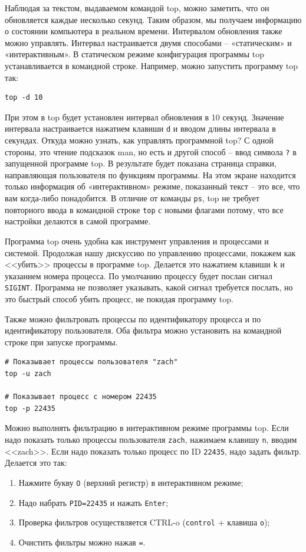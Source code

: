 \documentclass[12pt]{article}
\providecommand{\tightlist}{%
  \setlength{\itemsep}{0pt}\setlength{\parskip}{0pt}}
\begin{document}
Наблюдая за текстом, выдаваемом командой top, можно заметить, что он
обновляется каждые несколько секунд. Таким образом, мы получаем информацию
о состоянии компьютера в реальном времени. Интервалом обновления также
можно управлять. Интервал настраивается двумя способами -- «статическим»
и «интерактивным». В статическом режиме конфигурация программы top
устанавливается в командной строке. Например, можно запустить программу
top так:
\begin{verbatim}
top -d 10
\end{verbatim}

При этом в top будет установлен интервал обновления в 10 секунд. Значение интервала
настраивается нажатием клавиши \texttt{d} и вводом длины интервала в
секундах. Откуда можно узнать, как управлять программной top? С одной
стороны, это чтение подсказок man, но есть и другой способ -- ввод
символа \texttt{?} в запущенной программе top. В результате будет
показана страница справки, направляющая пользователя по функциям
программы. На этом экране находится только информация об «интерактивном»
режиме, показанный текст -- это все, что вам когда-либо понадобится. В
отличие от команды \texttt{ps}, top не требует повторного ввода в
командной строке \texttt{top} с новыми флагами потому, что все настройки
делаются в самой программе.

Программа top очень удобна как инструмент управления и процессами и
системой. Продолжая нашу дискуссию по управлению процессами, покажем как
<<убить>> процессы в программе top. Делается это нажатием клавиши
\texttt{k} и указанием номера процесса. По умолчанию процессу будет
послан сигнал \texttt{SIGINT}. Программа не позволяет указывать, какой
сигнал требуется послать, но это быстрый способ убить процесс, не
покидая программу top.

Также можно фильтровать процессы по идентификатору процесса и по
идентификатору пользователя. Оба фильтра можно установить на командной
строке при запуске программы.
\begin{verbatim}
# Показывает процессы пользователя "zach"
top -u zach

# Показывает процесс с номером 22435
top -p 22435
\end{verbatim}

Можно выполнять фильтрацию в интерактивном режиме программы top. Если
надо показать только процессы пользователя \texttt{zach}, нажимаем
клавишу \texttt{n}, вводим <<zach>>. Если надо показать только процесс по
ID \texttt{22435}, надо задать фильтр. Делается это так:
\begin{enumerate}
\tightlist
\item
  Нажмите букву \texttt{O} (верхний регистр) в интерактивном режиме;
\item
  Надо набрать \texttt{PID=22435} и нажать \texttt{Enter};
\item
  Проверка фильтров осуществляется CTRL-o (\texttt{control} + клавиша \texttt{o});
\item
  Очистить фильтры можно нажав \texttt{=}.
\end{enumerate}
\end{document}
